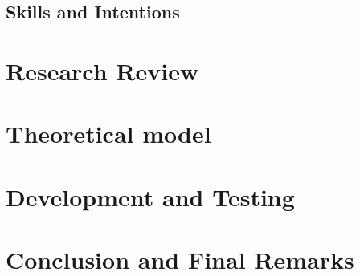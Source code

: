 \documentclass[a4paper,11pt]{article}
\begin{document}
\begin{multicols}{2}
\subsection{Skills and Intentions}
\section{Research Review}
\section{Theoretical model}
\section{Development and Testing}
\section{Conclusion and Final Remarks}

\newpage
\nocite{*}


\end{multicols}
\end{document}
